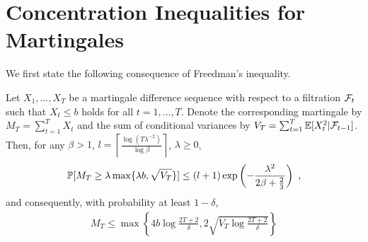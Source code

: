 \newpage



\appendix

\section{Concentration Inequalities for Martingales}\label{app: concentration inequalites for martingales}
We first state the following consequence of Freedman's inequality.
\begin{lemma}\label{lemma: kakade_cocentration_lemma} Let $X_1, \dots, X_T$ be a martingale difference sequence with respect to a filtration $\mathcal{F}_t$ such that $X_t \leq b$ holds for all $t = 1, \dots, T$. Denote the corresponding martingale by $M_T = \sum_{t=1}^T X_t$ and the sum of conditional variances by $V_T = \sum_{t=1}^T \mathbb{E}[X_t^2|\mathcal{F}_{t-1}]$. Then, for any $\beta  > 1$, $l = \left\lceil \frac{\log (T \lambda^{-2})}{\log \beta} \right \rceil$, $\lambda \geq 0$,
	\begin{align*}
		\mathbb{P}[M_T \geq \lambda \max\{\lambda b, \sqrt{V_T}\}] \leq (l+1) \exp\left(- \frac{\lambda^2}{2\beta + \frac{2}{3}}\right) \text{ ,}
	\end{align*}
	and consequently, with probability at least $1 -  \delta$,
	\begin{align}
	M_T \leq \max \left\{ 4 b \log \frac{2T + 2}{\delta}, 2 \sqrt{V_T \log \frac{2T + 2}{\delta}} \right\}
	\end{align}
\end{lemma}
